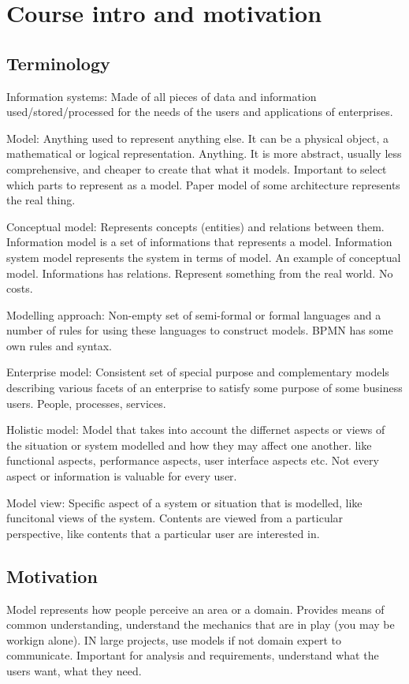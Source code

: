 \section{Course intro and motivation}
\subsection{Terminology}
Information systems: Made of all pieces of data and information used/stored/processed for the needs of the users and applications of enterprises.

Model: Anything used to represent anything else. It can be a physical object, a mathematical or logical representation. Anything. It is more abstract, usually less comprehensive, and cheaper to create that what it models. Important to select which parts to represent as a model. Paper model of some architecture represents the real thing.

Conceptual model: Represents concepts (entities) and relations between them. Information model is a set of informations that represents a model. Information system model represents the system in terms of model. An example of conceptual model. Informations has relations. Represent something from the real world. No costs.

Modelling approach: Non-empty set of semi-formal or formal languages and a number of rules for using these languages to construct models. BPMN has some own rules and syntax.

Enterprise model: Consistent set of special purpose and complementary models describing various facets of an enterprise to satisfy some purpose of some business users. People, processes, services. 

Holistic model: Model that takes into account the differnet aspects or views of the situation or system modelled and how they may affect one another. like functional aspects, performance aspects, user interface aspects etc. Not every aspect or information is valuable for every user.

Model view: Specific aspect of a system or situation that is modelled, like funcitonal views of the system. Contents are viewed from a particular perspective, like contents that a particular user are interested in.

\subsection{Motivation}
Model represents how people perceive an area or a domain. Provides means of common understanding, understand the mechanics that are in play (you may be workign alone). IN large projects, use models if not domain expert to communicate. Important for analysis and requirements, understand what the users want, what they need.


